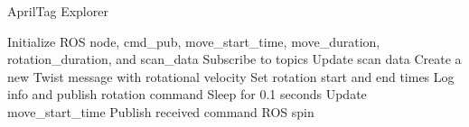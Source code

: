 \documentclass{article}
\begin{document}
\begin{algorithm}
\caption{AprilTag Explorer}
\begin{algorithmic}[1]
        \State Initialize ROS node, cmd\_pub, move\_start\_time, move\_duration, rotation\_duration, and scan\_data
        \State Subscribe to topics
    \EndProcedure
        \State Update scan data
    \EndProcedure
            \State Create a new Twist message with rotational velocity
            \State Set rotation start and end times
                \State Log info and publish rotation command
                \State Sleep for 0.1 seconds
            \EndWhile
            \State Update move\_start\_time
        \Else
            \State Publish received command
        \EndIf
    \EndProcedure
        \State ROS spin
    \EndProcedure
\end{algorithmic}
\end{algorithm}
\end{document}
